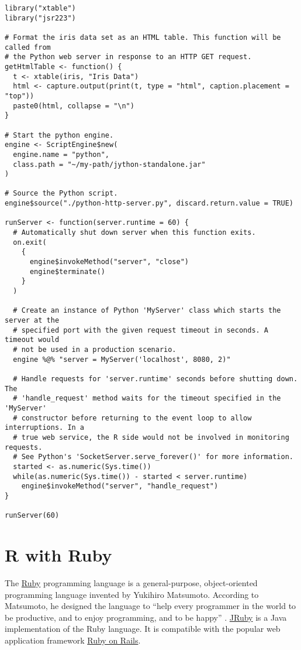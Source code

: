 \begin{verbatim}
library("xtable")
library("jsr223")

# Format the iris data set as an HTML table. This function will be called from
# the Python web server in response to an HTTP GET request.
getHtmlTable <- function() {
  t <- xtable(iris, "Iris Data")
  html <- capture.output(print(t, type = "html", caption.placement = "top"))
  paste0(html, collapse = "\n")
}

# Start the python engine.
engine <- ScriptEngine$new(
  engine.name = "python",
  class.path = "~/my-path/jython-standalone.jar"
)

# Source the Python script.
engine$source("./python-http-server.py", discard.return.value = TRUE)

runServer <- function(server.runtime = 60) {
  # Automatically shut down server when this function exits.
  on.exit(
    {
      engine$invokeMethod("server", "close")
      engine$terminate()
    }
  )

  # Create an instance of Python 'MyServer' class which starts the server at the
  # specified port with the given request timeout in seconds. A timeout would
  # not be used in a production scenario.
  engine %@% "server = MyServer('localhost', 8080, 2)"

  # Handle requests for 'server.runtime' seconds before shutting down. The 
  # 'handle_request' method waits for the timeout specified in the 'MyServer' 
  # constructor before returning to the event loop to allow interruptions. In a 
  # true web service, the R side would not be involved in monitoring requests.
  # See Python's 'SocketServer.serve_forever()' for more information.
  started <- as.numeric(Sys.time())
  while(as.numeric(Sys.time()) - started < server.runtime)
    engine$invokeMethod("server", "handle_request")
}

runServer(60)
\end{verbatim}

\section{R with Ruby}

The \href{https://www.ruby-lang.org}{Ruby} programming language is a general-purpose, object-oriented programming language invented by Yukihiro Matsumoto. According to Matsumoto, he designed the language to ``help every programmer in the world to be productive, and to enjoy programming, and to be happy'' \citep{rubyvideo}. \href{http://jruby.org/}{JRuby} is a Java implementation of the Ruby language. It is compatible with the popular web application framework \href{http://rubyonrails.org/}{Ruby on Rails}.

